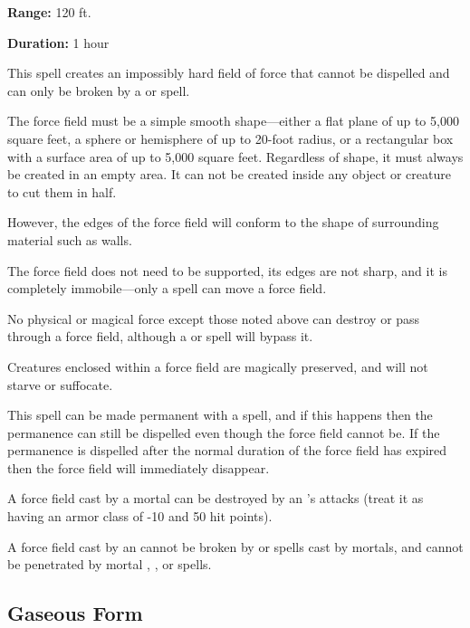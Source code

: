 \begin{multicols*}{2}
{\textbf{Range:} 120 ft.

\textbf{Duration:} 1 hour}

This spell creates an impossibly hard field of force that cannot be dispelled and can only be broken by a  or  spell.

The force field must be a simple smooth shape—either a flat plane of up to 5,000 square feet, a sphere or hemisphere of up to 20-foot radius, or a rectangular box with a surface area of up to 5,000 square feet. Regardless of shape, it must always be created in an empty area. It can not be created inside any object or creature to cut them in half.

However, the edges of the force field will conform to the shape of surrounding material such as walls.

The force field does not need to be supported, its edges are not sharp, and it is completely immobile—only a  spell can move a force field.

No physical or magical force except those noted above can destroy or pass through a force field, although a  or  spell will bypass it.

Creatures enclosed within a force field are magically preserved, and will not starve or suffocate.

This spell can be made permanent with a  spell, and if this happens then the permanence can still be dispelled even though the force field cannot be. If the permanence is dispelled after the normal duration of the force field has expired then the force field will immediately disappear.

A force field cast by a mortal can be destroyed by an ’s attacks (treat it as having an armor class of -10 and 50 hit points).

A force field cast by an  cannot be broken by  or  spells cast by mortals, and cannot be penetrated by mortal , , or  spells.

\subsection{Gaseous Form}\label{spell:Gaseous Form}
\end{multicols*}
